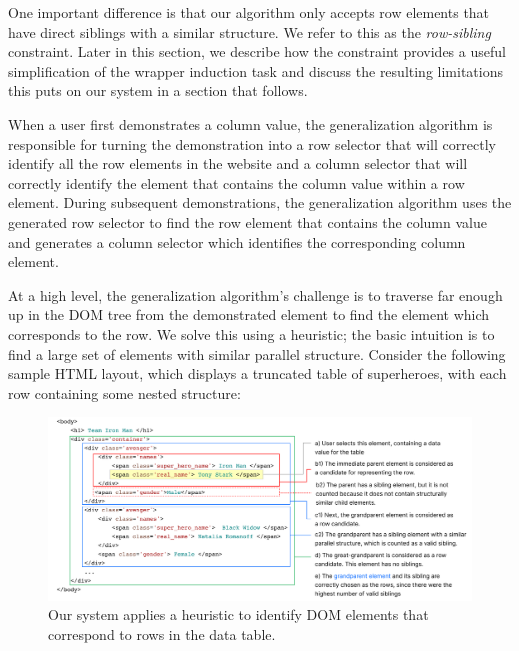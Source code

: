 \documentclass[sigconf,10pt]{acmart}
\begin{document}
One important difference is that our algorithm only accepts row elements
that have direct siblings with a similar structure. We refer to this as
the \emph{row-sibling} constraint. Later in this section, we describe
how the constraint provides a useful simplification of the wrapper
induction task and discuss the resulting limitations this puts on our
system in a section that follows.

When a user first demonstrates a column value, the generalization
algorithm is responsible for turning the demonstration into a row
selector that will correctly identify all the row elements in the
website and a column selector that will correctly identify the element
that contains the column value within a row element. During subsequent
demonstrations, the generalization algorithm uses the generated row
selector to find the row element that contains the column value and
generates a column selector which identifies the corresponding column
element.

At a high level, the generalization algorithm's challenge is to traverse
far enough up in the DOM tree from the demonstrated element to find the
element which corresponds to the row. We solve this using a heuristic;
the basic intuition is to find a large set of elements with similar
parallel structure. Consider the following sample HTML layout, which
displays a truncated table of superheroes, with each row containing some
nested structure:

\begin{figure}
  \includegraphics[width=\textwidth]{media/algorithm.png}
  \caption{\label{fig:algorithm}Our system applies a heuristic to identify DOM elements that correspond to rows in the data table.}
\end{figure}
\end{document}
